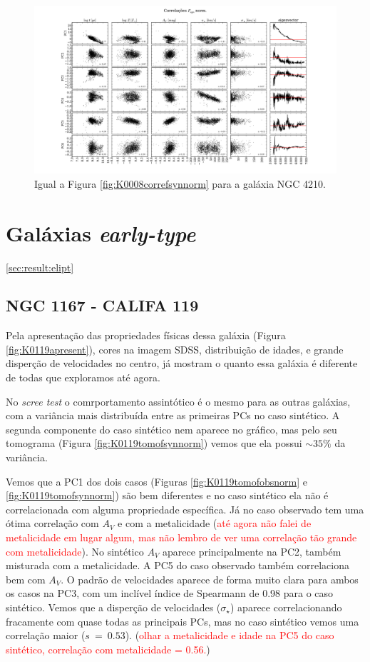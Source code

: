 \begin{figure}
    \includegraphics[width=1.3\textwidth, angle=-90]{figuras/K0518-correl-f_syn_norm-PCvsPhys.pdf}
	\caption[Correlações PCs vs. par\^ametros f\'isicos - $F_{syn}$ norm. - NGC 4210.]
	{Igual a Figura \ref{fig:K0008correfsynnorm} para a galáxia NGC 4210.}
    \label{fig:K0518correfsynnorm}
\end{figure}

\section{Gal\'axias {\em early-type}}
\ref{sec:result:elipt}

\subsection{NGC 1167 - CALIFA 119}

Pela apresentação das propriedades físicas dessa galáxia (Figura \ref{fig:K0119apresent}), cores na imagem SDSS,
distribuição de idades, e grande disperção de velocidades no centro, já mostram o quanto essa galáxia é diferente de
todas que exploramos até agora.

No {\em scree test} o comrportamento assintótico é o mesmo para as outras galáxias, com a variância mais distribuída
entre as primeiras PCs no caso sintético. A segunda componente do caso sintético nem aparece no gráfico, mas pelo seu
tomograma (Figura \ref{fig:K0119tomofsynnorm}) vemos que ela possui $\sim 35\%$ da variância.

Vemos que a PC1 dos dois casos (Figuras \ref{fig:K0119tomofobsnorm} e \ref{fig:K0119tomofsynnorm}) são bem diferentes e
no caso sintético ela não é correlacionada com alguma propriedade específica. Já no caso observado tem uma ótima
correlação com $A_V$ e com a metalicidade (\ojo \textcolor{red}{até agora não falei de metalicidade em lugar algum, mas
não lembro de ver uma correlação tão grande com metalicidade}). No sintético $A_V$ aparece principalmente na PC2, também
misturada com a metalicidade. A PC5 do caso observado também correlaciona bem com $A_V$. O padrão de velocidades aparece
de forma muito clara para ambos os casos na PC3, com um inclível índice de Spearmann de 0.98 para o caso sintético.
Vemos que a disperção de velocidades ($\sigma_\star$) aparece correlacionando fracamente com quase todas as principais
PCs, mas no caso sintético vemos uma correlação maior ($s\ =\ 0.53$). (\ojo \textcolor{red}{olhar a metalicidade e
idade na PC5 do caso sintético, correlação com metalicidade = 0.56.})

